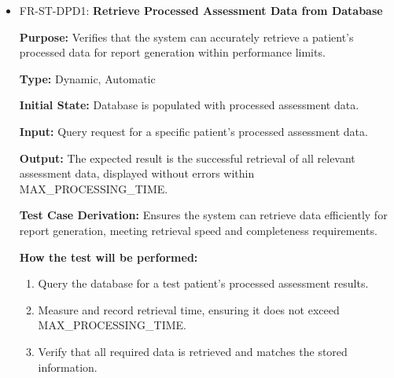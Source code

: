 \documentclass[12pt, titlepage]{article}
\begin{document}
\begin{itemize}
  \item FR-ST-DPD1: \textbf{Retrieve Processed Assessment Data from Database}
  \begin{mdframed}[linewidth=0.5mm]
      \textbf{Purpose:} Verifies that the system can accurately retrieve a patient’s processed data for report generation within performance limits. \par
      \textbf{Type:} Dynamic, Automatic \par
      \textbf{Initial State:} Database is populated with processed assessment data. \par
      \textbf{Input:} Query request for a specific patient’s processed assessment data. \par
      \textbf{Output:} The expected result is the successful retrieval of all relevant assessment data, displayed without errors within MAX\_PROCESSING\_TIME. \par
      \textbf{Test Case Derivation:} Ensures the system can retrieve data efficiently for report generation, meeting retrieval speed and completeness requirements. \par
      \textbf{How the test will be performed:}
      \begin{enumerate}[noitemsep]
        \item Query the database for a test patient’s processed assessment results.
        \item Measure and record retrieval time, ensuring it does not exceed \\ MAX\_PROCESSING\_TIME.
        \item Verify that all required data is retrieved and matches the stored information.
      \end{enumerate}
  \end{mdframed}


\end{itemize}
\end{document}
